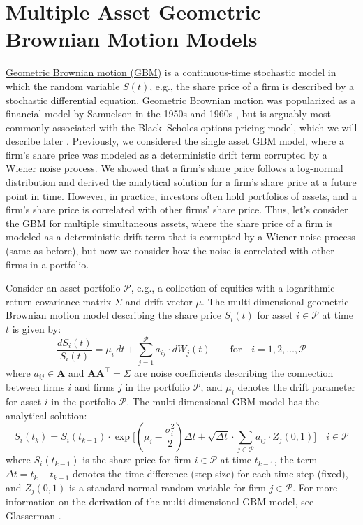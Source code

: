 \documentclass[11pt]{article}
\theoremstyle{definition}
\begin{document}
\section{Multiple Asset Geometric Brownian Motion Models}
\href{https://en.wikipedia.org/wiki/Geometric_Brownian_motion}{Geometric Brownian motion (GBM)} is a continuous-time stochastic model in which the random variable $S(t)$, 
e.g., the share price of a firm is described by a stochastic differential equation.
Geometric Brownian motion was popularized as a financial model by Samuelson in the 1950s and 1960s \cite{Merton2006}, 
but is arguably most commonly associated with the Black–Scholes options pricing model, which we will describe later 
\cite{BlackScholes1973}. Previously, we considered the single asset GBM model, 
where a firm's share price was modeled as a deterministic drift term corrupted by a Wiener noise process. 
We showed that a firm's share price follows a log-normal distribution and derived the analytical solution for a firm's share price at a future point in time.
However, in practice, investors often hold portfolios of assets, and a firm's share price is correlated with other firms' share price.
Thus, let's consider the GBM for multiple simultaneous assets, where the share price of a firm is modeled as a deterministic drift term 
that is corrupted by a Wiener noise process (same as before), but now we consider how the noise is correlated with other firms in a portfolio.

Consider an asset portfolio $\mathcal{P}$, e.g., a collection of equities with a logarithmic return covariance matrix $\Sigma$ and drift vector $\mu$.
The multi-dimensional geometric Brownian motion model describing the share price $S_{i}(t)$ for asset $i\in\mathcal{P}$ at time $t$ is given by: 
\begin{equation*}
\frac{dS_{i}\left(t\right)}{S_{i}(t)} = \mu_{i}\,{dt}+\sum_{j=1}^{\mathcal{P}}a_{ij}\cdot{dW_{j}(t)}\qquad\text{for}\quad{i=1,2,\dots,\mathcal{P}}
\end{equation*}
where $a_{ij}\in\mathbf{A}$ and $\mathbf{A}\mathbf{A}^{\top} = \Sigma$ are noise coefficients describing the connection between firms $i$ and firms $j$ in the portfolio $\mathcal{P}$,
and $\mu_{i}$ denotes the drift parameter for asset $i$ in the portfolio $\mathcal{P}$.
The multi-dimensional GBM model has the analytical solution:
\begin{equation*}
S_{i}(t_{k}) = S_{i}(t_{k-1})\cdot\exp\Biggl[\left(\mu_{i}-\frac{\sigma_{i}^{2}}{2}\right)\Delta{t} + \sqrt{\Delta{t}}\cdot\sum_{j\in\mathcal{P}}a_{ij}\cdot{Z_{j}(0,1)}\Biggr]\quad{i\in\mathcal{P}}
\end{equation*}
where $S_{i}(t_{k-1})$ is the share price for firm $i\in\mathcal{P}$ at time $t_{k-1}$,  the term $\Delta{t} = t_{k} - t_{k-1}$ denotes the time difference (step-size) 
for each time step (fixed), and $Z_{j}(0,1)$ is a standard normal random variable for firm $j\in\mathcal{P}$.
For more information on the derivation of the multi-dimensional GBM model, see Glasserman \cite{Glasserman:2004ua}.
\end{document}
